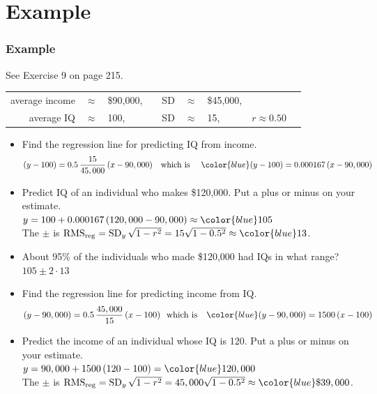 \documentclass[t]{beamer}
\begin{document}
\section{Example}
\begin{frame}
\frametitle{Example}

\scriptsize

See Exercise 9 on page 215.   
\begin{center}
{\setlength{\tabcolsep}{2pt}\begin{tabular}{rclcrclcc}
average income & $\approx$ & \$90,000, & \hspace{5pt} & SD & $\approx$ & \$45,000,\\
average IQ & $\approx$ & 100, & \hspace{5pt} & SD & $\approx$ & 15, &
   \hspace{10pt} $r\approx 0.50$\\[-8pt]
\end{tabular}}
\end{center}

\begin{itemize}
\item<2-> Find the regression line for predicting IQ from income.\vspace{-3pt}
\[(y - 100) = 0.5\,\frac{15}{45,000}\,(x - 90,000)\hspace{10pt} \mbox{which is }\hspace{10pt}
  {\color{blue}(y - 100) = 0.000167\,(x - 90,000)}\]
\item<3-> Predict  IQ of an individual who makes \$120,000.  Put a plus or minus on your estimate.\\
  $y = 100 + 0.000167\,(120,000 - 90,000) \approx {\color{blue}105}$\\[3pt]
  The $\pm$ is $\mbox{RMS}_{\mbox{\scriptsize reg}} = \mbox{SD}_y\,\sqrt{1-r^2} = 15\sqrt{1-0.5^2}\approx 
   {\color{blue}13}$.\vspace{2pt}
\item<4-> About 95\% of the individuals who made \$120,000 had IQs in what range?
{\color{blue}  $105\pm 2\cdot 13$}
\item<5->  Find the regression line for predicting income from IQ.\vspace{-5pt}
\[(y - 90,000) = 0.5\,\frac{45,000}{15}\,(x - 100)\hspace{7pt} \mbox{which is }\hspace{7pt}
  {\color{blue}(y - 90,000) = 1500\,(x - 100)}\vspace{-3pt}\]
\item<6-> Predict the income of an individual whose IQ is 120.  Put a plus or minus on your estimate.\\[3pt]
  $y = 90,000 + 1500\,(120 - 100) = {\color{blue}120,000}$\\[3pt]
  The $\pm$ is $\mbox{RMS}_{\mbox{\scriptsize reg}} = \mbox{SD}_y\,\sqrt{1-r^2} = 45,000\sqrt{1-0.5^2}\approx 
   {\color{blue}\$39,000}$.
\end{itemize}
\label{lastpage}
\end{frame}
\end{document}
